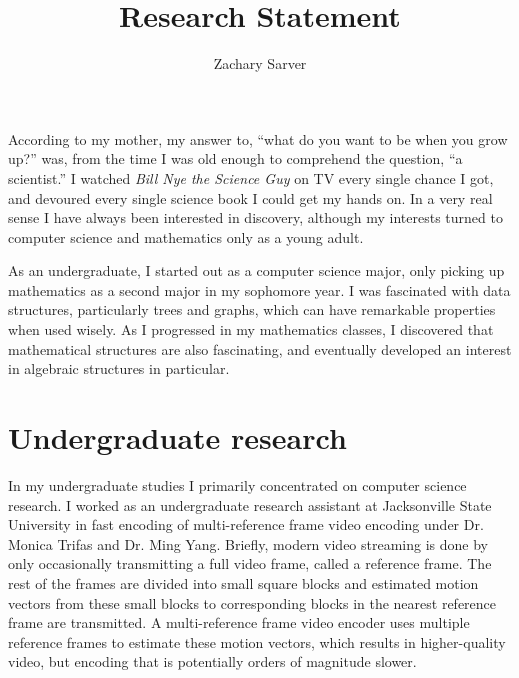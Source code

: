 \documentclass[11pt]{article}
\begin{document}
\fancyhf{}
\lhead[\thepage / \pageref{LastPage}]{Zachary Sarver}


\title{Research Statement}
\author{Zachary Sarver}
\date{}
\maketitle

According to my mother, my answer to, ``what do you want to be when you grow
up?'' was, from the time I was old enough to comprehend the question, ``a
scientist.'' I watched \textit{Bill Nye the Science Guy} on TV every single
chance I got, and devoured every single science book I could get my hands on. In
a very real sense I have always been interested in discovery, although my
interests turned to computer science and mathematics only as a young adult.

As an undergraduate, I started out as a computer science major, only picking up
mathematics as a second major in my sophomore year. I was fascinated with data
structures, particularly trees and graphs, which can have remarkable properties
when used wisely. As I progressed in my mathematics classes, I discovered that
mathematical structures are also fascinating, and eventually developed an
interest in algebraic structures in particular.

\section{Undergraduate research}

In my undergraduate studies I primarily concentrated on computer science
research. I worked as an undergraduate research assistant at Jacksonville State
University in fast encoding of multi-reference frame video encoding under
Dr. Monica Trifas and Dr. Ming Yang. Briefly, modern video streaming is done by
only occasionally transmitting a full video frame, called a reference frame. The
rest of the frames are divided into small square blocks and estimated motion
vectors from these small blocks to corresponding blocks in the nearest reference
frame are transmitted. A multi-reference frame video encoder uses multiple
reference frames to estimate these motion vectors, which results in
higher-quality video, but encoding that is potentially orders of magnitude
slower.
\end{document}
